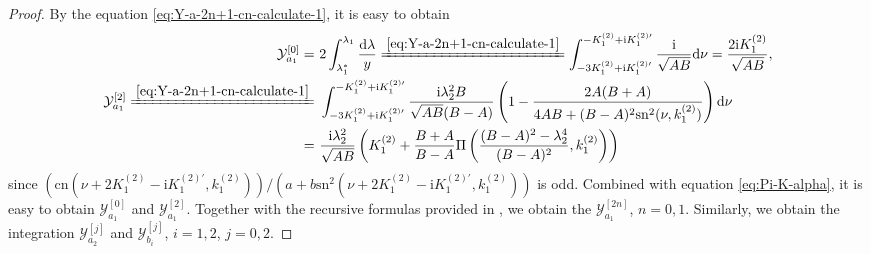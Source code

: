 \documentclass[11pt,reqno]{amsart}
\newcommand{\ii}{\mathrm{i}}
\newcommand{\sn}{\mathrm{sn}}
\newcommand{\cn}{\mathrm{cn}}
\newcommand{\dd}{\mathrm{d}}
\numberwithin{equation}{section}
\begin{document}
\begin{proof}
	By  the equation \eqref{eq:Y-a-2n+1-cn-calculate-1}, it is easy to obtain 
	\begin{equation}\nonumber
		\begin{split}
			\mathcal{Y}_{a_1}^{[0]}=&\ 2\int_{\lambda_1^*}^{\lambda_1}\frac{\dd  \lambda}{y}
			\xlongequal{\eqref{eq:Y-a-2n+1-cn-calculate-1}} \int_{-3  K^{(2)}_1+\ii   K^{(2)\prime}_1}^{-  K^{(2)}_1+\ii   K^{(2)\prime}_1} \frac{\ii }{\sqrt{AB}} \dd \nu=\frac{2\ii K^{(2)}_1}{\sqrt{AB}}, \\
			\mathcal{Y}_{a_1}^{[2]}
			\xlongequal{\eqref{eq:Y-a-2n+1-cn-calculate-1}}
			&\  \int_{-3  K^{(2)}_1+\ii   K^{(2)\prime}_1}^{-  K^{(2)}_1+\ii   K^{(2)\prime}_1} \frac{\ii \lambda_2^2B}{\sqrt{AB}(B-A)} \left(1-\frac{2A(B+A)}{4AB+(B-A)^2\sn^2(\nu,  k^{(2)}_1)}\right) \dd \nu\\
			=&\  \frac{\ii\lambda_2^2 }{\sqrt{AB}}\left(  K^{(2)}_1 +\frac{B+A}{B-A}\Pi\left(\frac{(B-A)^2-\lambda_2^4}{(B-A)^2},  k^{(2)}_1\right)\right)
		\end{split}
	\end{equation}
	since $(\cn(\nu+2  K^{(2)}_1-\ii   K^{(2)\prime}_1,  k^{(2)}_1))/(a+b\sn^2(\nu+2  K^{(2)}_1-\ii   K^{(2)\prime}_1,  k^{(2)}_1))$ is odd.
	Combined with equation \eqref{eq:Pi-K-alpha}, it is easy to obtain $\mathcal{Y}_{a_1}^{[0]}$ and $\mathcal{Y}_{a_1}^{[2]}$.
	Together with the recursive formulas provided in , we obtain the $\mathcal{Y}_{a_1}^{[2n]}$, $n=0,1$.
	Similarly, we obtain the integration $\mathcal{Y}_{a_2}^{[j]}$ and $\mathcal{Y}_{b_i}^{[j]}$, $i=1,2$, $j=0,2$.
\end{proof}
\end{document}
